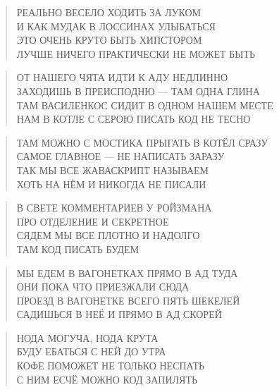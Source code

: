 \poemtitle{***}
\begin{verse}
РЕАЛЬНО ВЕСЕЛО ХОДИТЬ ЗА ЛУКОМ\\
И КАК МУДАК В ЛОССИНАХ УЛЫБАТЬСЯ\\
ЭТО ОЧЕНЬ КРУТО БЫТЬ ХИПСТОРОМ\\
ЛУЧШЕ НИЧЕГО ПРАКТИЧЕСКИ НЕ МОЖЕТ БЫТЬ
\end{verse}

\poemtitle{***}
\begin{verse}
ОТ НАШЕГО ЧЯТА ИДТИ К АДУ НЕДЛИННО\\
ЗАХОДИШЬ В ПРЕИСПОДНЮ — ТАМ ОДНА ГЛИНА\\
ТАМ ВАСИЛЕНКОС СИДИТ В ОДНОМ НАШЕМ МЕСТЕ\\
НАМ В КОТЛЕ С СЕРОЮ ПИСАТЬ КОД НЕ ТЕСНО
\end{verse}

\poemtitle{***}
\begin{verse}
ТАМ МОЖНО С МОСТИКА ПРЫГАТЬ В КОТЁЛ СРАЗУ\\
САМОЕ ГЛАВНОЕ — НЕ НАПИСАТЬ ЗАРАЗУ\\
ТАК МЫ ВСЕ ЖАВАСКРИПТ НАЗЫВАЕМ\\
ХОТЬ НА НЁМ И НИКОГДА НЕ ПИСАЛИ
\end{verse}

\poemtitle{***}
\begin{verse}
В СВЕТЕ КОММЕНТАРИЕВ У РОЙЗМАНА\\
ПРО ОТДЕЛЕНИЕ И СЕКРЕТНОЕ\\
СЯДЕМ МЫ ВСЕ ПЛОТНО И НАДОЛГО\\
ТАМ КОД ПИСАТЬ БУДЕМ
\end{verse}

\poemtitle{***}
\begin{verse}
МЫ ЕДЕМ В ВАГОНЕТКАХ ПРЯМО В АД ТУДА\\
ОНИ ПОКА ЧТО ПРИЕЗЖАЛИ СЮДА\\
ПРОЕЗД В ВАГОНЕТКЕ ВСЕГО ПЯТЬ ШЕКЕЛЕЙ\\
САДИШЬСЯ В НЕЁ И ПРЯМО В АД СКОРЕЙ
\end{verse}

\poemtitle{***}
\begin{verse}
НОДА МОГУЧА, НОДА КРУТА\\
БУДУ ЕБАТЬСЯ С НЕЙ ДО УТРА\\
КОФЕ ПОМОЖЕТ НЕ ТОЛЬКО НЕСПАТЬ\\
С НИМ ЕСЧЁ МОЖНО КОД ЗАПИЛЯТЬ
\end{verse}

